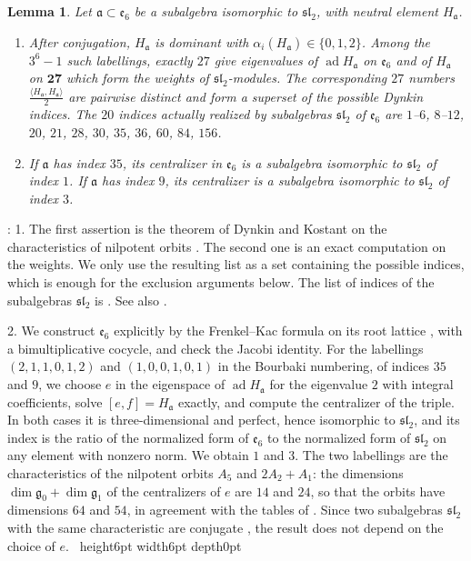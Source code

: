\documentclass[leqno]{article}
\newcommand{\qed}{\hfill \vrule height6pt  width6pt depth0pt}
\newtheorem{lemma}[thm]{Lemma}
\newenvironment{proof}[1][]{\noindent {\it Proof #1} : }{\hbox{~}\qed
\smallskip
}
\numberwithin{equation}{section}
\begin{document}
\begin{lemma}
\label{lem:sl2-e6}
Let $\mathfrak a \subset \mathfrak e_6$ be a subalgebra isomorphic to $\mathfrak{sl}_2$, with neutral element $H_{\mathfrak a}$.
\begin{enumerate}
\item After conjugation, $H_{\mathfrak a}$ is dominant with $\alpha_i(H_{\mathfrak a}) \in \{0,1,2\}$. Among the $3^6-1$ such labellings, exactly $27$ give eigenvalues of $\operatorname{ad}H_{\mathfrak a}$ on $\mathfrak e_6$ and of $H_{\mathfrak a}$ on $\mathbf{27}$ which form the weights of $\mathfrak{sl}_2$-modules. The corresponding $27$ numbers $\frac{\langle H_{\mathfrak a},H_{\mathfrak a}\rangle}{2}$ are pairwise distinct and form a superset of the possible Dynkin indices. The $20$ indices actually realized by subalgebras $\mathfrak{sl}_2$ of $\mathfrak e_6$ are $1$--$6$, $8$--$12$, $20$, $21$, $28$, $30$, $35$, $36$, $60$, $84$, $156$.
\item If $\mathfrak a$ has index $35$, its centralizer in $\mathfrak e_6$ is a subalgebra isomorphic to $\mathfrak{sl}_2$ of index $1$. If $\mathfrak a$ has index $9$, its centralizer is a subalgebra isomorphic to $\mathfrak{sl}_2$ of index $3$.
\end{enumerate}
\end{lemma}

\begin{proof}
1. The first assertion is the theorem of Dynkin and Kostant on the characteristics of nilpotent orbits \cite[Chapter 3]{CoM93}. The second one is an exact computation on the weights. We only use the resulting list as a set containing the possible indices, which is enough for the exclusion arguments below. The list of indices of the subalgebras $\mathfrak{sl}_2$ is \cite[Table 18]{Dyn52}. See also \cite[p.~16]{Gan19}.

2. We construct $\mathfrak e_6$ explicitly by the Frenkel--Kac formula on its root lattice \cite{FrK80}, with a bimultiplicative cocycle, and check the Jacobi identity. For the labellings $(2,1,1,0,1,2)$ and $(1,0,0,1,0,1)$ in the Bourbaki numbering, of indices $35$ and $9$, we choose $e$ in the eigenspace of $\operatorname{ad}H_{\mathfrak a}$ for the eigenvalue $2$ with integral coefficients, solve $[e,f] = H_{\mathfrak a}$ exactly, and compute the centralizer of the triple. In both cases it is three-dimensional and perfect, hence isomorphic to $\mathfrak{sl}_2$, and its index is the ratio of the normalized form of $\mathfrak e_6$ to the normalized form of $\mathfrak{sl}_2$ on any element with nonzero norm. We obtain $1$ and $3$. The two labellings are the characteristics of the nilpotent orbits $A_5$ and $2A_2+A_1$: the dimensions $\dim\mathfrak g_0+\dim\mathfrak g_1$ of the centralizers of $e$ are $14$ and $24$, so that the orbits have dimensions $64$ and $54$, in agreement with the tables of \cite[Chapter 8]{CoM93}. Since two subalgebras $\mathfrak{sl}_2$ with the same characteristic are conjugate \cite[Chapter 3]{CoM93}, the result does not depend on the choice of $e$.
\end{proof}
\end{document}
